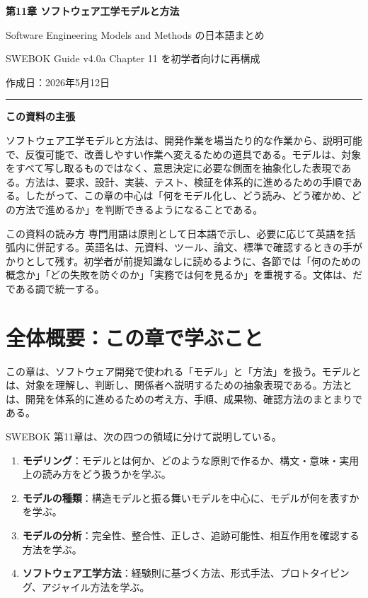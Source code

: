\documentclass[a4paper,11pt]{ltjsarticle}
\begin{document}
\thispagestyle{empty}
\begin{center}
  {\LARGE\bfseries 第11章 ソフトウェア工学モデルと方法}\par\vspace{0.8em}
  {\large Software Engineering Models and Methods の日本語まとめ}\par\vspace{0.7em}
  {SWEBOK Guide v4.0a Chapter 11 を初学者向けに再構成}\par\vspace{0.7em}
  {作成日：2026年5月12日}\par
\end{center}
\vspace{0.5em}\hrule\vspace{0.7em}

\noindent\textbf{この資料の主張}\par
ソフトウェア工学モデルと方法は、開発作業を場当たり的な作業から、説明可能で、反復可能で、改善しやすい作業へ変えるための道具である。モデルは、対象をすべて写し取るものではなく、意思決定に必要な側面を抽象化した表現である。方法は、要求、設計、実装、テスト、検証を体系的に進めるための手順である。したがって、この章の中心は「何をモデル化し、どう読み、どう確かめ、どの方法で進めるか」を判断できるようになることである。

\begin{pointbox}{この資料の読み方}
専門用語は原則として日本語で示し、必要に応じて英語を括弧内に併記する。英語名は、元資料、ツール、論文、標準で確認するときの手がかりとして残す。初学者が前提知識なしに読めるように、各節では「何のための概念か」「どの失敗を防ぐのか」「実務では何を見るか」を重視する。文体は、だである調で統一する。
\end{pointbox}

\vspace{1.0em}
\tableofcontents
\clearpage

\section*{全体概要：この章で学ぶこと}
この章は、ソフトウェア開発で使われる「モデル」と「方法」を扱う。モデルとは、対象を理解し、判断し、関係者へ説明するための抽象表現である。方法とは、開発を体系的に進めるための考え方、手順、成果物、確認方法のまとまりである。

SWEBOK 第11章は、次の四つの領域に分けて説明している。
\begin{enumerate}
  \item \textbf{モデリング}：モデルとは何か、どのような原則で作るか、構文・意味・実用上の読み方をどう扱うかを学ぶ。
  \item \textbf{モデルの種類}：構造モデルと振る舞いモデルを中心に、モデルが何を表すかを学ぶ。
  \item \textbf{モデルの分析}：完全性、整合性、正しさ、追跡可能性、相互作用を確認する方法を学ぶ。
  \item \textbf{ソフトウェア工学方法}：経験則に基づく方法、形式手法、プロトタイピング、アジャイル方法を学ぶ。
\end{enumerate}
\end{document}
